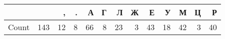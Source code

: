 \begin{tabular}{lrrrrrrrrrrrr}
\toprule
 &   & , & . & А & Г & Л & Ж & Е & У & М & Ц & Р \\
\midrule
Count & 143 & 12 & 8 & 66 & 8 & 23 & 3 & 43 & 18 & 42 & 3 & 40 \\
\bottomrule
\end{tabular}
